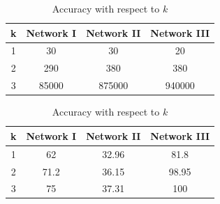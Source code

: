\documentclass[11pt]{article}
\begin{document}
\begin{table}[!htb]
    \begin{minipage}{.5\linewidth}
    \caption{Running time (RT) with respect to $k$}
      \centering
     \begin{tabular}{|c|c|c|c|}
     \hline
         k& Network I & Network II & Network III \\
     \hline
     1&30& 30& 20 \\\hline
     2&290 &380&380	\\\hline
3 &85000&875000&940000	 \\\hline
 



\end{tabular}
    \end{minipage}
    \begin{minipage}{.5\linewidth}
      \caption{Accuracy with respect to $k$}
      \centering
     \begin{tabular}{|c|c|c|c|}
     \hline
     k& Network I & Network II & Network III \\
     \hline
      1 & 62&32.96& 81.8 \\\hline
2 &71.2 & 36.15& 98.95\\\hline
3 &75& 37.31& 100\\\hline
\end{tabular}
    \end{minipage}\\
    
\end{table}
\end{document}

